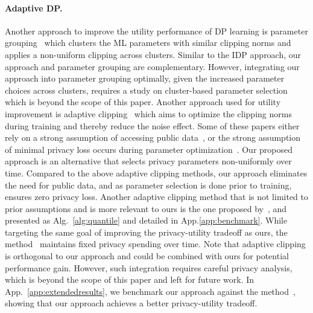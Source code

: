 \paragraph{Adaptive DP.} 
Another approach to improve the utility performance of DP learning is 
parameter grouping~\citep{yang2023dynamic, mcmahan2017learning} which clusters the ML parameters with similar clipping norms and applies a non-uniform clipping across clusters. Similar to the IDP approach, our approach and parameter grouping are complementary. However, integrating our approach into parameter grouping optimally, given the increased parameter choices across clusters, requires a study on cluster-based parameter selection which is beyond the scope of this paper. Another approach used for utility improvement is adaptive clipping~\citep{
pichapati2019adaclip, andrew2021differentially, li2022private} which aims to optimize the clipping norms during training and thereby reduce the noise effect. %
{Some of these papers either rely on a strong assumption of accessing public data~\citep{li2022private}, or the strong assumption of minimal privacy loss occurs during parameter optimization~\citep{pichapati2019adaclip}. Our proposed approach is an alternative that selects privacy parameters non-uniformly over time. Compared to the above adaptive clipping methods, our approach eliminates the need for public data, and as parameter selection is done prior to training, ensures zero privacy loss. Another adaptive clipping method that is not limited to prior assumptions and is more relevant to ours is the one proposed by~\citet{andrew2021differentially}, and presented as Alg.~\ref{alg:quantile} and detailed in App.\ref{app:benchmark}. While targeting the same goal of improving the privacy-utility tradeoff as ours, the method~\citep{andrew2021differentially} maintains fixed privacy spending over time. Note that adaptive clipping is orthogonal to our approach and could be combined with ours for potential performance gain. However, such integration requires careful privacy analysis, which is beyond the scope of this paper and left for future work. In App.~\ref{app:extendedresults}, we benchmark our approach against the method~\citep{andrew2021differentially}, showing that our approach achieves a better privacy-utility tradeoff.}


